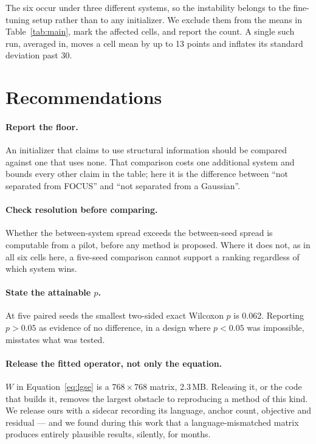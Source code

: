 \documentclass[11pt]{article}
\begin{document}
The six occur under three different systems, so the instability belongs to the
fine-tuning setup rather than to any initializer. We exclude them from the
means in Table~\ref{tab:main}, mark the affected cells, and report the count.
A single such run, averaged in, moves a cell mean by up to 13 points and
inflates its standard deviation past 30.

\section{Recommendations}

\paragraph{Report the floor.} An initializer that claims to use structural
information should be compared against one that uses none. That comparison
costs one additional system and bounds every other claim in the table; here
it is the difference between ``not separated from FOCUS'' and ``not separated
from a Gaussian''.

\paragraph{Check resolution before comparing.} Whether the between-system
spread exceeds the between-seed spread is computable from a pilot, before any
method is proposed. Where it does not, as in all six cells here, a five-seed
comparison cannot support a ranking regardless of which system wins.

\paragraph{State the attainable $p$.} At five paired seeds the smallest
two-sided exact Wilcoxon $p$ is 0.062. Reporting $p > 0.05$ as evidence of no
difference, in a design where $p < 0.05$ was impossible, misstates what was
tested.

\paragraph{Release the fitted operator, not only the equation.} $W$ in
Equation~\ref{eq:lgse} is a $768 \times 768$ matrix, 2.3\,MB. Releasing it,
or the code that builds it, removes the largest obstacle to reproducing a
method of this kind. We release ours with a sidecar recording its language,
anchor count, objective and residual --- and we found during this work that a
language-mismatched matrix produces entirely plausible results, silently, for
months.
\end{document}
